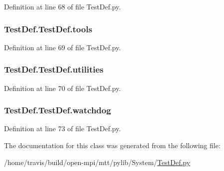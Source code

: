 Definition at line 68 of file Test\-Def.\-py.

\hypertarget{classTestDef_1_1TestDef_a2414cc1583555b0c758e0f9f0952a787}{
\subsubsection[{tools}]{\setlength{\rightskip}{0pt plus 5cm}Test\-Def.\-Test\-Def.\-tools}}\label{classTestDef_1_1TestDef_a2414cc1583555b0c758e0f9f0952a787}


Definition at line 69 of file Test\-Def.\-py.

\hypertarget{classTestDef_1_1TestDef_a0b9ea6f06c02401ad62e06c4cfd80bd2}{
\subsubsection[{utilities}]{\setlength{\rightskip}{0pt plus 5cm}Test\-Def.\-Test\-Def.\-utilities}}\label{classTestDef_1_1TestDef_a0b9ea6f06c02401ad62e06c4cfd80bd2}


Definition at line 70 of file Test\-Def.\-py.

\hypertarget{classTestDef_1_1TestDef_a40da46aa95507cffa798cb152fa69e27}{
\subsubsection[{watchdog}]{\setlength{\rightskip}{0pt plus 5cm}Test\-Def.\-Test\-Def.\-watchdog}}\label{classTestDef_1_1TestDef_a40da46aa95507cffa798cb152fa69e27}


Definition at line 73 of file Test\-Def.\-py.



The documentation for this class was generated from the following file\-:\begin{DoxyCompactItemize}
\item 
/home/travis/build/open-\/mpi/mtt/pylib/\-System/\hyperlink{TestDef_8py}{Test\-Def.\-py}\end{DoxyCompactItemize}
